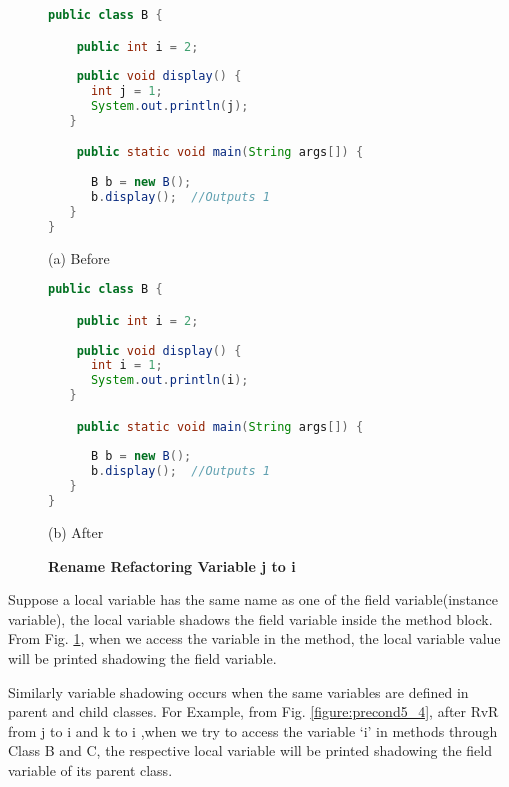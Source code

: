 \begin{figure}[th]
\centering
\begin{minipage}[t]{0.8\linewidth}
\begin{lstlisting}[language=java, basicstyle=\scriptsize\ttfamily,frame=single]
public class B {

    public int i = 2;
    
    public void display() {
      int j = 1;
      System.out.println(j); 		
   }

    public static void main(String args[]) {
    
      B b = new B();
      b.display();  //Outputs 1
   }
}
\end{lstlisting}
\centering(a) Before 
\end{minipage}
\hfill
\begin{minipage}[t]{0.8\linewidth}
\begin{lstlisting}[language=java, basicstyle=\scriptsize\ttfamily,frame=single]
public class B {

    public int i = 2;
    
    public void display() {
      int i = 1;
      System.out.println(i); 		
   }

    public static void main(String args[]) {
    
      B b = new B();
      b.display();  //Outputs 1
   }
}
\end{lstlisting}
\centering(b) After 
\end{minipage}
\caption{\textbf{Rename Refactoring Variable j to i }}
\label{figure:precond5_3}
\end{figure}


Suppose a local variable has the same name as one of the field variable(instance variable), the local variable shadows the field variable inside the method block. From Fig. \ref{figure:precond5_3}, when we access the variable in the method, the local variable value will be printed shadowing the field variable.

Similarly variable shadowing occurs when the same variables are defined in parent and child classes.
For Example, from Fig. \ref{figure:precond5_4}, after RvR from j to i and k to i ,when we try to access the variable `i' in methods through Class B and C, the respective local variable will be printed shadowing the field variable of its parent class.


